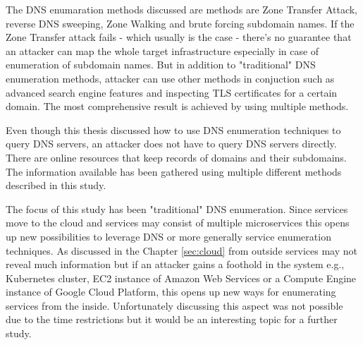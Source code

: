 The DNS enumaration methods discussed are methods are Zone Transfer Attack, reverse DNS sweeping, Zone Walking and brute forcing subdomain names. If the Zone Transfer attack fails - which usually is the case - there's no guarantee that an attacker can map the whole target infrastructure especially in case of enumeration of subdomain names. But in addition to "traditional" DNS enumeration methods, attacker can use other methods in conjuction such as advanced search engine features and inspecting TLS certificates for a certain domain. The most comprehensive result is achieved by using multiple methods.

Even though this thesis discussed how to use DNS enumeration techniques to query DNS servers, an attacker does not have to query DNS servers directly. There are online resources that keep records of domains and their subdomains. The information available has been gathered using multiple different methods described in this study.

The focus of this study has been "traditional" DNS enumeration. Since services move to the cloud and services may consist of multiple microservices this opens up new possibilities to leverage DNS or more generally service enumeration techniques. As discussed in the Chapter \ref{sec:cloud} from outside services may not reveal much information but if an attacker gains a foothold in the system e.g., Kubernetes cluster, EC2 instance of Amazon Web Services or a Compute Engine instance of Google Cloud Platform, this opens up new ways for enumerating services from the inside. Unfortunately discussing this aspect was not possible due to the time restrictions but it would be an interesting topic for a further study.


